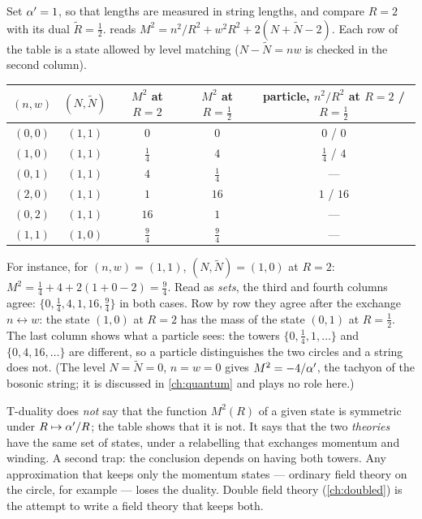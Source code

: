 \begin{example}[The same spectrum at $R=2$ and $R=\tfrac12$]\label{ex:intro:spectrum}
Set $\alpha'=1$, so that lengths are measured in string lengths, and compare $R=2$ with its dual
$\tilde R=\tfrac12$.  reads $M^2=n^2/R^2+w^2R^2+2(N+\tilde N-2)$.
Each row of the table is a state allowed by level matching ($N-\tilde N=nw$ is checked in the
second column).
\begin{center}
\begin{tabular}{@{}ccccc@{}}
\toprule
$(n,w)$ & $(N,\tilde N)$ & $M^2$ at $R=2$ & $M^2$ at $R=\tfrac12$ & particle, $n^2/R^2$ at
$R=2$ / $R=\tfrac12$\\
\midrule
$(0,0)$ & $(1,1)$ & $0$ & $0$ & $0$ / $0$\\
$(1,0)$ & $(1,1)$ & $\tfrac14$ & $4$ & $\tfrac14$ / $4$\\
$(0,1)$ & $(1,1)$ & $4$ & $\tfrac14$ & --- \\
$(2,0)$ & $(1,1)$ & $1$ & $16$ & $1$ / $16$\\
$(0,2)$ & $(1,1)$ & $16$ & $1$ & --- \\
$(1,1)$ & $(1,0)$ & $\tfrac94$ & $\tfrac94$ & --- \\
\bottomrule
\end{tabular}
\end{center}
For instance, for $(n,w)=(1,1)$, $(N,\tilde N)=(1,0)$ at $R=2$:
$M^2=\tfrac14+4+2(1+0-2)=\tfrac94$. Read as \emph{sets}, the third and fourth columns agree:
$\{0,\tfrac14,4,1,16,\tfrac94\}$ in both cases. Row by row they agree after the exchange
$n\leftrightarrow w$: the state $(1,0)$ at $R=2$ has the mass of the state $(0,1)$ at
$R=\tfrac12$. The last column shows what a particle sees: the towers $\{0,\tfrac14,1,\dots\}$ and
$\{0,4,16,\dots\}$ are different, so a particle distinguishes the two circles and a string
does not. (The level $N=\tilde N=0$, $n=w=0$ gives $M^2=-4/\alpha'$, the tachyon of the bosonic
string; it is discussed in \cref{ch:quantum} and plays no role here.)
\end{example}

\begin{pitfallbox}
T-duality does \emph{not} say that the function $M^2(R)$ of a given state is symmetric under
$R\mapsto\alpha'/R$; the table shows that it is not. It says that the two \emph{theories} have the
same set of states, under a relabelling that exchanges momentum and winding. A second trap:
the conclusion depends on having both towers. Any approximation that keeps only the momentum
states --- ordinary field theory on the circle, for example --- loses the duality. Double field
theory (\cref{ch:doubled}) is the attempt to write a field theory that keeps both.
\end{pitfallbox}

